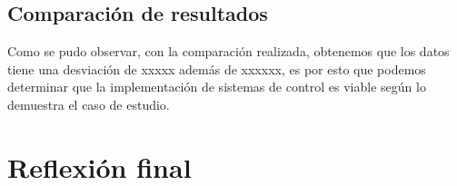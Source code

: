 \subsection{Comparación de resultados}

Como se pudo observar, con la comparación realizada, obtenemos que los datos tiene una desviación de xxxxx además de xxxxxx, es por esto que podemos determinar que la implementación de sistemas de control es viable según lo demuestra el caso de estudio.



\section{Reflexión final}